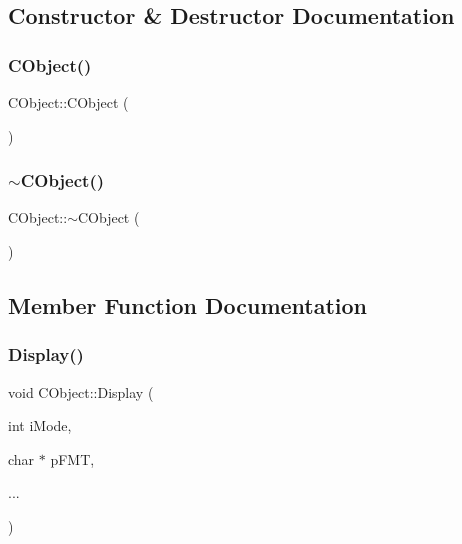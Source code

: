 \subsection{Constructor \& Destructor Documentation}
\mbox{\label{classCObject_ac44111d5ac75248a616df61b038c4153}} 
\subsubsection{\texorpdfstring{CObject()}{CObject()}}
{\footnotesize\ttfamily C\+Object\+::\+C\+Object (\begin{DoxyParamCaption}{ }\end{DoxyParamCaption})}

\mbox{\label{classCObject_a93a3c3bc7d9a6462ef00e25404d9b0eb}} 
\subsubsection{\texorpdfstring{$\sim$CObject()}{~CObject()}}
{\footnotesize\ttfamily C\+Object\+::$\sim$\+C\+Object (\begin{DoxyParamCaption}{ }\end{DoxyParamCaption})\hspace{0.3cm}{\ttfamily [virtual]}}



\subsection{Member Function Documentation}
\mbox{\label{classCObject_ade0e58d8dab14d912ec5465aecf74b10}} 
\subsubsection{\texorpdfstring{Display()}{Display()}}
{\footnotesize\ttfamily void C\+Object\+::\+Display (\begin{DoxyParamCaption}\item[{int}]{i\+Mode,  }\item[{char $\ast$}]{p\+F\+MT,  }\item[{}]{... }\end{DoxyParamCaption})\hspace{0.3cm}{\ttfamily [static]}}

